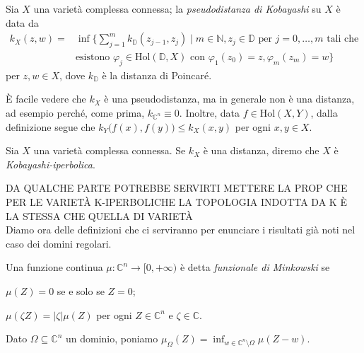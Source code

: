 \begin{defn}
    Sia $X$ una varietà complessa connessa; la \textit{pseudodistanza di Kobayashi} su $X$ è data da
    \begin{equation}\begin{split}
        k_X(z,w)=&\inf\Bigg\{\sum_{j=1}^m k_{\mathbb{D}}(z_{j-1},z_j) \mid m \in \mathbb{N}, z_j \in \mathbb{D}\text{ per }j=0,\dots,m\text{ tali che}\\
        &\text{esistono }\varphi_j\in \text{Hol}(\mathbb{D},X) \text{ con } \varphi_1(z_0)=z,\varphi_m(z_m)=w\Bigg\}
    \end{split}\end{equation}
    per $z,w \in X$, dove $k_{\mathbb{D}}$ è la distanza di Poincaré.
\end{defn}

\begin{oss} \label{k_lip}
    È facile vedere che $k_X$ è una pseudodistanza, ma in generale non è una distanza, ad esempio perché, come prima, $k_{\mathbb{C}^n}\equiv 0$. Inoltre, data $f \in \text{Hol}(X,Y)$, dalla definizione segue che $k_Y\big(f(x),f(y)\big) \le k_X(x,y)$ per ogni $x,y \in X$.
\end{oss}

\begin{defn}
    Sia $X$ una varietà complessa connessa. Se $k_X$ è una distanza, diremo che $X$ è \textit{Kobayashi-iperbolica}.
\end{defn}

DA QUALCHE PARTE POTREBBE SERVIRTI METTERE LA PROP CHE PER LE VARIETÀ K-IPERBOLICHE LA TOPOLOGIA INDOTTA DA K È LA STESSA CHE QUELLA DI VARIETÀ \\

Diamo ora delle definizioni che ci serviranno per enunciare i risultati già noti nel caso dei domini regolari.

\begin{defn}
    Una funzione continua $\mu:\mathbb{C}^n \longrightarrow [0,+\infty)$ è detta \textit{funzionale di Minkowski} se
    \begin{nlist}
        \item $\mu(Z)=0$ se e solo se $Z=0$;
        \item $\mu(\zeta Z)=|\zeta|\mu(Z)$ per ogni $Z \in \mathbb{C}^n$ e $\zeta\in\mathbb{C}$.
    \end{nlist}
    Dato $\Omega\subseteq\mathbb{C}^n$ un dominio, poniamo $\mu_{\Omega}(Z)=\inf_{w\in\mathbb{C}^n\setminus\Omega}\mu(Z-w)$.
\end{defn}

